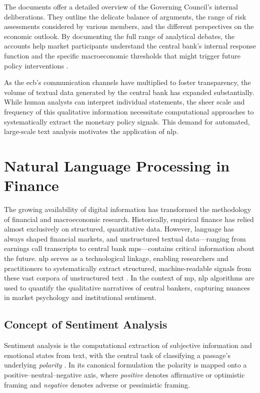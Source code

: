 The documents offer a detailed overview of the Governing Council's internal deliberations. They outline the delicate balance of arguments, the range of risk assessments considered by various members, and the different perspectives on the economic outlook. By documenting the full range of analytical debates, the accounts help market participants understand the central bank's internal response function and the specific macroeconomic thresholds that might trigger future policy interventions \cite[p. 26--27]{CorbisieroLawton2021}.

As the \gls{ecb}'s communication channels have multiplied to foster transparency, the volume of textual data generated by the central bank has expanded substantially. While human analysts can interpret individual statements, the sheer scale and frequency of this qualitative information necessitate computational approaches to systematically extract the monetary policy signals. This demand for automated, large-scale text analysis motivates the application of \gls{nlp}.

\section{Natural Language Processing in Finance}
The growing availability of digital information has transformed the methodology of financial and macroeconomic research. Historically, empirical finance has relied almost exclusively on structured, quantitative data. However, language has always shaped financial markets, and unstructured textual data---ranging from earnings call transcripts to central bank \gls{mps}---contains critical information about the future. \gls{nlp} serves as a technological linkage, enabling researchers and practitioners to systematically extract structured, machine-readable signals from these vast corpora of unstructured text \cite{IBM_IE_2025}. In the context of \gls{mp}, \gls{nlp} algorithms are used to quantify the qualitative narratives of central bankers, capturing nuances in market psychology and institutional sentiment.

\subsection{Concept of Sentiment Analysis}
\label{sec:sentiment_concept}
Sentiment analysis is the computational extraction of subjective information and emotional states from text, with the central task of classifying a passage's underlying \textit{polarity} \cite{xing2020financial}. In its canonical formulation the polarity is mapped onto a positive--neutral--negative axis, where \textit{positive} denotes affirmative or optimistic framing and \textit{negative} denotes adverse or pessimistic framing.

